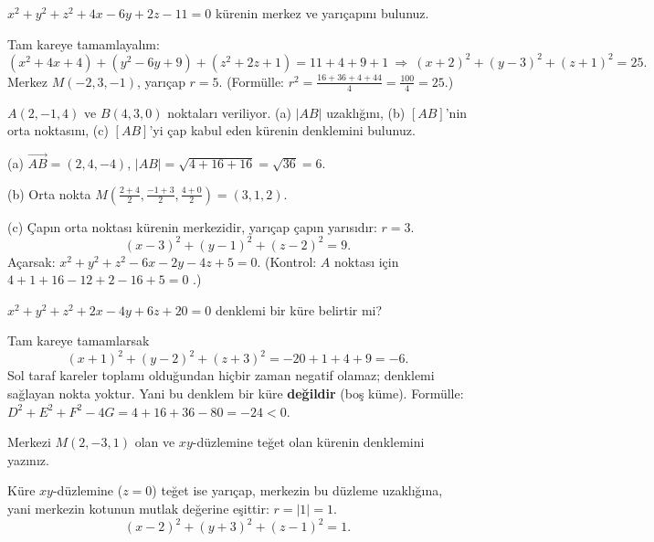 \begin{soru}
$x^2+y^2+z^2+4x-6y+2z-11=0$ kürenin merkez ve yarıçapını bulunuz.
\end{soru}
\begin{cevap}
Tam kareye tamamlayalım:
\[
(x^2+4x+4)+(y^2-6y+9)+(z^2+2z+1)=11+4+9+1
\ \Rightarrow\ (x+2)^2+(y-3)^2+(z+1)^2=25.
\]
Merkez $M(-2,3,-1)$, yarıçap $r=5$. (Formülle: $r^2=\frac{16+36+4+44}{4}=\frac{100}{4}=25$.)
\end{cevap}

\begin{soru}
$A(2,-1,4)$ ve $B(4,3,0)$ noktaları veriliyor. (a) $|AB|$ uzaklığını, (b) $[AB]$'nin orta noktasını, (c) $[AB]$'yi çap kabul eden kürenin denklemini bulunuz.
\end{soru}
\begin{cevap}
(a) $\overrightarrow{AB}=(2,4,-4)$, $|AB|=\sqrt{4+16+16}=\sqrt{36}=6$.

(b) Orta nokta $M\left(\frac{2+4}{2},\frac{-1+3}{2},\frac{4+0}{2}\right)=(3,1,2)$.

(c) Çapın orta noktası kürenin merkezidir, yarıçap çapın yarısıdır: $r=3$.
\[
(x-3)^2+(y-1)^2+(z-2)^2=9 .
\]
Açarsak: $x^2+y^2+z^2-6x-2y-4z+5=0$. (Kontrol: $A$ noktası için $4+1+16-12+2-16+5=0$ \checkmark.)
\end{cevap}

\begin{soru}
$x^2+y^2+z^2+2x-4y+6z+20=0$ denklemi bir küre belirtir mi?
\end{soru}
\begin{cevap}
Tam kareye tamamlarsak
\[
(x+1)^2+(y-2)^2+(z+3)^2=-20+1+4+9=-6 .
\]
Sol taraf kareler toplamı olduğundan hiçbir zaman negatif olamaz; denklemi sağlayan nokta yoktur. Yani bu denklem bir küre \textbf{değildir} (boş küme). Formülle: $D^2+E^2+F^2-4G=4+16+36-80=-24<0$.
\end{cevap}

\begin{soru}
Merkezi $M(2,-3,1)$ olan ve $xy$-düzlemine teğet olan kürenin denklemini yazınız.
\end{soru}
\begin{cevap}
Küre $xy$-düzlemine ($z=0$) teğet ise yarıçap, merkezin bu düzleme uzaklığına, yani merkezin kotunun mutlak değerine eşittir: $r=|1|=1$.
\[
(x-2)^2+(y+3)^2+(z-1)^2=1 .
\]
\end{cevap}

